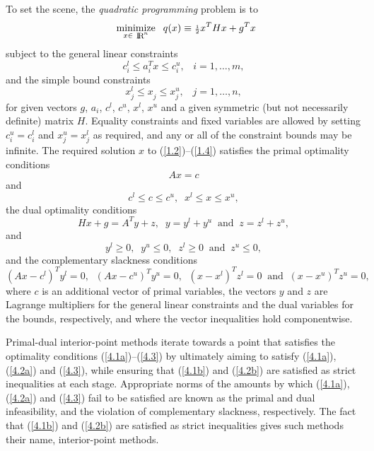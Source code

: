 \documentclass[acmtocl,acmnow]{acmtrans2m}
\newcommand{\minin}[1]{ {\renewcommand{\arraystretch}{0.8} 
                     \begin{array}[t]{c} 
                     \mbox{minimize} \vspace*{-1mm} \\ 
                     \mbox{ $\scriptstyle #1 $ } 
                     \end{array} \;} }
\newcommand{\tim}[1]{\;\; \mbox{#1} \;\;}
\newcommand{\req}[1]{(\ref{#1})}
\newcommand{\sfrac}[2]{{\scriptstyle \frac{#1}{#2}}}
\newcommand{\half}{\sfrac{1}{2}}
\newcommand{\eqn}[2]{\begin{equation}\label{#1}{#2}\end{equation}}
\newcommand{\smallRe}
     {\mbox{\raisebox{-0.8pt}{\footnotesize I\hskip -1.5pt R\hskip -0.5pt}}}
\begin{document}
To set the scene, the {\em quadratic programming} problem is to
\eqn{1.2}{\minin{x \in \smallRe^n} q(x) \equiv 
\half x^T H x + g^T x}
subject to the general linear constraints
\eqn{1.3}{c_{i}^{l}  \leq  a_{i}^{T}x  \leq  c_{i}^{u}, \;\;\; 
 i = 1, \ldots , m,}
and the simple bound constraints
\eqn{1.4}{x_{j}^{l}  \leq  x_{j}^{ } \leq  x_{j}^{u} , \;\;\; 
 j = 1, \ldots , n,}
for given
vectors $g$, $a_{i}$, $c^{l}$, $c^{u}$, $x^{l}$, $x^{u}$ 
and a given symmetric (but not necessarily definite) matrix $H$. Equality 
constraints and fixed variables are allowed by setting
$c_{i}^{u} = c_{i}^{l}$ and $x_{j}^{u} = x_{j}^{l}$ as required,
and any or all of the constraint bounds may be infinite.
The required solution $x$ to \req{1.2}--\req{1.4} satisfies 
the primal optimality conditions
\eqn{4.1a}{A x = c}
and 
\eqn{4.1b}{
 c^{l} \leq c \leq c^{u}, \;\;
x^{l} \leq x \leq x^{u},}
the dual optimality conditions
\eqn{4.2a}{
 H x + g =
 A^{T} y + z,\;\;
 y = y^{l} + y^{u} \tim{and}
 z = z^{l} + z^{u} ,}
and 
\eqn{4.2b}{
 y^{l} \geq 0 , \;\;
 y^{u} \leq 0 , \;\;
 z^{l} \geq 0 \;\; \mbox{and} \;\;
 z^{u} \leq 0 ,}
and the complementary slackness conditions 
\eqn{4.3}{
( A x - c^{l} )^{T} y^{l} = 0  ,\;\;
( A x - c^{u} )^{T} y^{u} = 0  ,\;\;
(x -x^{l} )^{T} z^{l} = 0   \tim{and}
(x -x^{u} )^{T} z^{u} = 0 ,}
where $c$ is an additional vector of primal variables,
the vectors $y$ and $z$ are Lagrange multipliers for
the general linear constraints and the dual variables for the bounds,
respectively, and where the vector inequalities hold componentwise.

Primal-dual interior-point methods iterate towards a point
that satisfies the optimality conditions \req{4.1a}--\req{4.3}
by ultimately aiming to satisfy
\req{4.1a}, \req{4.2a} and \req{4.3}, while ensuring that 
\req{4.1b} and \req{4.2b} are 
satisfied as strict inequalities at each stage. 
Appropriate norms of the amounts by 
which \req{4.1a}, \req{4.2a} and \req{4.3} fail to be satisfied are known as the
primal and dual infeasibility, and the violation of complementary slackness,
respectively. The fact that \req{4.1b} and \req{4.2b} are satisfied as strict 
inequalities gives such methods their name, interior-point methods.
\end{document}
